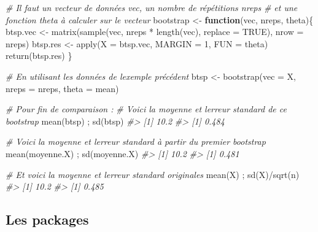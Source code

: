 \documentclass[
]{book}
\newenvironment{Shaded}{}{}
\newcommand{\AttributeTok}[1]{#1}
\newcommand{\CommentTok}[1]{\textit{#1}}
\newcommand{\ConstantTok}[1]{#1}
\newcommand{\ControlFlowTok}[1]{\textbf{#1}}
\newcommand{\DecValTok}[1]{#1}
\newcommand{\FunctionTok}[1]{#1}
\newcommand{\NormalTok}[1]{#1}
\newcommand{\OtherTok}[1]{#1}
\newcommand{\SpecialCharTok}[1]{#1}
\begin{document}
\begin{Shaded}
\begin{Highlighting}[]
\CommentTok{\# Il faut un vecteur de données \textasciigrave{}vec\textasciigrave{}, un nombre de répétitions \textasciigrave{}nreps\textasciigrave{}}
\CommentTok{\# et une fonction \textasciigrave{}theta\textasciigrave{} à calculer sur le vecteur}
\NormalTok{bootstrap }\OtherTok{\textless{}{-}} \ControlFlowTok{function}\NormalTok{(vec, nreps, theta)\{}
\NormalTok{  btsp.vec }\OtherTok{\textless{}{-}} \FunctionTok{matrix}\NormalTok{(}\FunctionTok{sample}\NormalTok{(vec, nreps }\SpecialCharTok{*} \FunctionTok{length}\NormalTok{(vec), }\AttributeTok{replace =} \ConstantTok{TRUE}\NormalTok{),}
                     \AttributeTok{nrow =}\NormalTok{ nreps)}
\NormalTok{  btsp.res }\OtherTok{\textless{}{-}} \FunctionTok{apply}\NormalTok{(}\AttributeTok{X =}\NormalTok{ btsp.vec, }\AttributeTok{MARGIN =} \DecValTok{1}\NormalTok{, }\AttributeTok{FUN =}\NormalTok{ theta)}
  \FunctionTok{return}\NormalTok{(btsp.res)}
\NormalTok{\}}

\CommentTok{\# En utilisant les données de l\textquotesingle{}exemple précédent}
\NormalTok{btsp }\OtherTok{\textless{}{-}} \FunctionTok{bootstrap}\NormalTok{(}\AttributeTok{vec =}\NormalTok{ X, }\AttributeTok{nreps =}\NormalTok{ nreps, }\AttributeTok{theta =}\NormalTok{ mean)}

\CommentTok{\# Pour fin de comparaison :}
\CommentTok{\# Voici la moyenne et l\textquotesingle{}erreur standard de ce bootstrap}
\FunctionTok{mean}\NormalTok{(btsp)  ; }\FunctionTok{sd}\NormalTok{(btsp)}
\CommentTok{\#\textgreater{} [1] 10.2}
\CommentTok{\#\textgreater{} [1] 0.484}

\CommentTok{\# Voici la moyenne et l\textquotesingle{}erreur standard à partir du premier bootstrap}
\FunctionTok{mean}\NormalTok{(moyenne.X)  ; }\FunctionTok{sd}\NormalTok{(moyenne.X)}
\CommentTok{\#\textgreater{} [1] 10.2}
\CommentTok{\#\textgreater{} [1] 0.481}

\CommentTok{\# Et voici la moyenne et l\textquotesingle{}erreur standard originales}
\FunctionTok{mean}\NormalTok{(X) ; }\FunctionTok{sd}\NormalTok{(X)}\SpecialCharTok{/}\FunctionTok{sqrt}\NormalTok{(n)}
\CommentTok{\#\textgreater{} [1] 10.2}
\CommentTok{\#\textgreater{} [1] 0.485}
\end{Highlighting}
\end{Shaded}

\hypertarget{les-packages-1}{%
\subsection{Les packages}\label{les-packages-1}}
\end{document}
